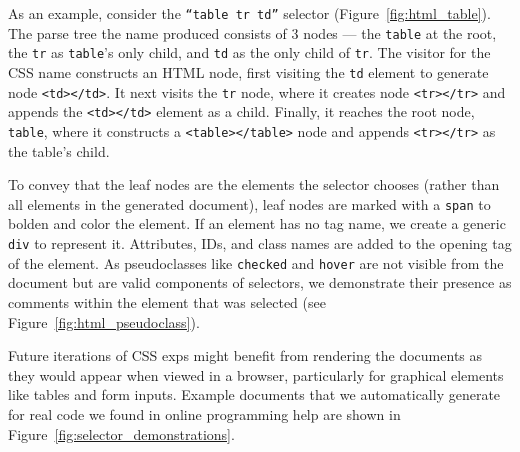 As an example, consider the \texttt{``table tr td''} selector (Figure~\ref{fig:html_table}).
The parse tree the \Gls{name} produced consists of 3 nodes --- the \texttt{table} at the root, the \texttt{tr} as \texttt{table}'s only child, and \texttt{td} as the only child of \texttt{tr}.
The visitor for the CSS \Gls{name} constructs an HTML node, first visiting the \texttt{td} element to generate node \texttt{<td></td>}.
It next visits the \texttt{tr} node, where it creates node \texttt{<tr></tr>} and appends the \texttt{<td></td>} element as a child.
Finally, it reaches the root node, \texttt{table}, where it constructs a \texttt{<table></table>} node and appends \texttt{<tr></tr>} as the table's child.
\fi

To convey that the leaf nodes are the elements the selector chooses (rather than all elements in the generated document), leaf nodes are marked with a \texttt{span} to bolden and color the element.
If an element has no tag name, we create a generic \texttt{div} to represent it.
Attributes, IDs, and class names are added to the opening tag of the element.
As pseudoclasses like \texttt{checked} and \texttt{hover} are not visible from the document but are valid components of selectors, we demonstrate their presence as comments within the element that was selected (see Figure~\ref{fig:html_pseudoclass}).

Future iterations of CSS \glspl{exp} might benefit from rendering the documents as they would appear when viewed in a browser, particularly for graphical elements like tables and form inputs.
Example documents that we automatically generate for real code we found in online programming help are shown in Figure~\ref{fig:selector_demonstrations}.
\fi
{}
\fi

